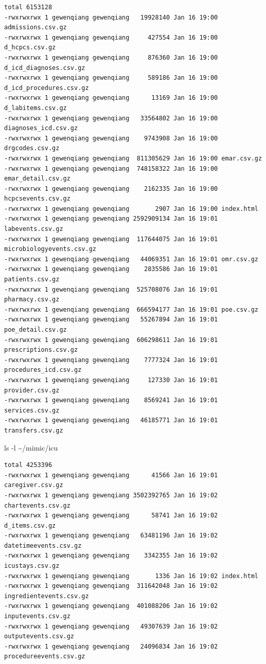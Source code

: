 \documentclass[
]{article}
\newenvironment{Shaded}{\begin{snugshade}}{\end{snugshade}}
\newcommand{\AttributeTok}[1]{\textcolor[rgb]{0.40,0.45,0.13}{#1}}
\newcommand{\FunctionTok}[1]{\textcolor[rgb]{0.28,0.35,0.67}{#1}}
\newcommand{\NormalTok}[1]{\textcolor[rgb]{0.00,0.23,0.31}{#1}}
\begin{document}
\begin{verbatim}
total 6153128
-rwxrwxrwx 1 gewenqiang gewenqiang   19928140 Jan 16 19:00 admissions.csv.gz
-rwxrwxrwx 1 gewenqiang gewenqiang     427554 Jan 16 19:00 d_hcpcs.csv.gz
-rwxrwxrwx 1 gewenqiang gewenqiang     876360 Jan 16 19:00 d_icd_diagnoses.csv.gz
-rwxrwxrwx 1 gewenqiang gewenqiang     589186 Jan 16 19:00 d_icd_procedures.csv.gz
-rwxrwxrwx 1 gewenqiang gewenqiang      13169 Jan 16 19:00 d_labitems.csv.gz
-rwxrwxrwx 1 gewenqiang gewenqiang   33564802 Jan 16 19:00 diagnoses_icd.csv.gz
-rwxrwxrwx 1 gewenqiang gewenqiang    9743908 Jan 16 19:00 drgcodes.csv.gz
-rwxrwxrwx 1 gewenqiang gewenqiang  811305629 Jan 16 19:00 emar.csv.gz
-rwxrwxrwx 1 gewenqiang gewenqiang  748158322 Jan 16 19:00 emar_detail.csv.gz
-rwxrwxrwx 1 gewenqiang gewenqiang    2162335 Jan 16 19:00 hcpcsevents.csv.gz
-rwxrwxrwx 1 gewenqiang gewenqiang       2907 Jan 16 19:00 index.html
-rwxrwxrwx 1 gewenqiang gewenqiang 2592909134 Jan 16 19:01 labevents.csv.gz
-rwxrwxrwx 1 gewenqiang gewenqiang  117644075 Jan 16 19:01 microbiologyevents.csv.gz
-rwxrwxrwx 1 gewenqiang gewenqiang   44069351 Jan 16 19:01 omr.csv.gz
-rwxrwxrwx 1 gewenqiang gewenqiang    2835586 Jan 16 19:01 patients.csv.gz
-rwxrwxrwx 1 gewenqiang gewenqiang  525708076 Jan 16 19:01 pharmacy.csv.gz
-rwxrwxrwx 1 gewenqiang gewenqiang  666594177 Jan 16 19:01 poe.csv.gz
-rwxrwxrwx 1 gewenqiang gewenqiang   55267894 Jan 16 19:01 poe_detail.csv.gz
-rwxrwxrwx 1 gewenqiang gewenqiang  606298611 Jan 16 19:01 prescriptions.csv.gz
-rwxrwxrwx 1 gewenqiang gewenqiang    7777324 Jan 16 19:01 procedures_icd.csv.gz
-rwxrwxrwx 1 gewenqiang gewenqiang     127330 Jan 16 19:01 provider.csv.gz
-rwxrwxrwx 1 gewenqiang gewenqiang    8569241 Jan 16 19:01 services.csv.gz
-rwxrwxrwx 1 gewenqiang gewenqiang   46185771 Jan 16 19:01 transfers.csv.gz
\end{verbatim}

\begin{Shaded}
\begin{Highlighting}[]
\FunctionTok{ls} \AttributeTok{{-}l}\NormalTok{ \textasciitilde{}/mimic/icu}
\end{Highlighting}
\end{Shaded}

\begin{verbatim}
total 4253396
-rwxrwxrwx 1 gewenqiang gewenqiang      41566 Jan 16 19:01 caregiver.csv.gz
-rwxrwxrwx 1 gewenqiang gewenqiang 3502392765 Jan 16 19:02 chartevents.csv.gz
-rwxrwxrwx 1 gewenqiang gewenqiang      58741 Jan 16 19:02 d_items.csv.gz
-rwxrwxrwx 1 gewenqiang gewenqiang   63481196 Jan 16 19:02 datetimeevents.csv.gz
-rwxrwxrwx 1 gewenqiang gewenqiang    3342355 Jan 16 19:02 icustays.csv.gz
-rwxrwxrwx 1 gewenqiang gewenqiang       1336 Jan 16 19:02 index.html
-rwxrwxrwx 1 gewenqiang gewenqiang  311642048 Jan 16 19:02 ingredientevents.csv.gz
-rwxrwxrwx 1 gewenqiang gewenqiang  401088206 Jan 16 19:02 inputevents.csv.gz
-rwxrwxrwx 1 gewenqiang gewenqiang   49307639 Jan 16 19:02 outputevents.csv.gz
-rwxrwxrwx 1 gewenqiang gewenqiang   24096834 Jan 16 19:02 procedureevents.csv.gz
\end{verbatim}
\end{document}
